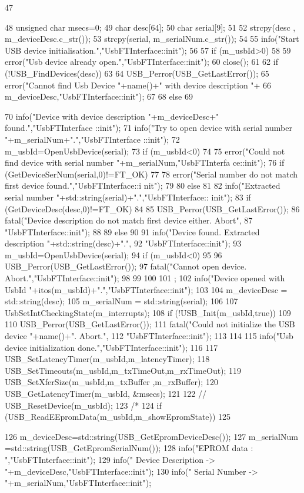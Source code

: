 \begin{DoxyCode}
47                                   {
48   unsigned char msecs=0;
49   char desc[64];
50   char serial[9];      
51 
52   strcpy(desc  , m_deviceDesc.c_str());
53   strcpy(serial, m_serialNum.c_str());  
54 
55   info("Start USB device initialisation.","UsbFTInterface::init");
56 
57   if (m_usbId>0)
58   {
59     error("Usb device already open.","UsbFTInterface::init");    
60     close();
61   }
62   if (!USB_FindDevices(desc))
63   {
64     USB_Perror(USB_GetLastError());
65     error("Cannot find Usb Device "+name()+" with device description "+
66           m_deviceDesc,"UsbFTInterface::init");
67   }
68   else
69   {
70     info("Device with device description "+m_deviceDesc+" found.","UsbFTInterface
      ::init");
71     info("Try to open device with serial number "+m_serialNum+".","UsbFTInterface
      ::init");
72     m_usbId=OpenUsbDevice(serial);
73     if (m_usbId<0)
74     {
75       error("Could not find device with serial number "+m_serialNum,"UsbFTInterfa
      ce::init");
76       if (GetDeviceSerNum(serial,0)!=FT_OK)
77       {
78         error("Serial number do not match first device found.","UsbFTInterface::i
      nit");
79       }
80       else
81       {
82         info("Extracted serial number "+std::string(serial)+".","UsbFTInterface::
      init");
83         if (GetDeviceDesc(desc,0)!=FT_OK)
84         {
85           USB_Perror(USB_GetLastError());  
86           fatal("Device description do not match first device either. Abort",
87                 "UsbFTInterface::init");
88         }
89         else
90         {
91           info("Device found. Extracted description "+std::string(desc)+".",
92                "UsbFTInterface::init");
93           m_usbId=OpenUsbDevice(serial);
94           if (m_usbId<0)
95           {
96             USB_Perror(USB_GetLastError());  
97             fatal("Cannot open device. Abort.","UsbFTInterface::init"); 
98           }          
99         }
100       }
101     };
102     info("Device opened with UsbId "+itos(m_usbId)+".","UsbFTInterface::init");
103 
104     m_deviceDesc = std::string(desc);
105     m_serialNum  = std::string(serial);
106     
107     UsbSetIntCheckingState(m_interrupts);
108     if (!USB_Init(m_usbId,true))
109     {
110       USB_Perror(USB_GetLastError());  
111       fatal("Could not initialize the USB device "+name()+". Abort.",
112             "UsbFTInterface::init");
113     }
114 
115     info("Usb device initialization done.","UsbFTInterface::init");
116 
117     USB_SetLatencyTimer(m_usbId,m_latencyTimer);
118     USB_SetTimeouts(m_usbId,m_txTimeOut,m_rxTimeOut);
119     USB_SetXferSize(m_usbId,m_txBuffer ,m_rxBuffer);
120     USB_GetLatencyTimer(m_usbId, &msecs);
121 
122     //    USB_ResetDevice(m_usbId);
123 /*
124     if (USB_ReadEEpromData(m_usbId,m_showEpromState))
125     {
126       m_deviceDesc=std::string(USB_GetEpromDeviceDesc());
127       m_serialNum =std::string(USB_GetEpromSerialNum());
128       info("EPROM data : ","UsbFTInterface::init");
129       info("  Device Description -> "+m_deviceDesc,"UsbFTInterface::init");
130       info("  Serial Number      -> "+m_serialNum,"UsbFTInterface::init");      
      
}}}
\end{DoxyCode}
